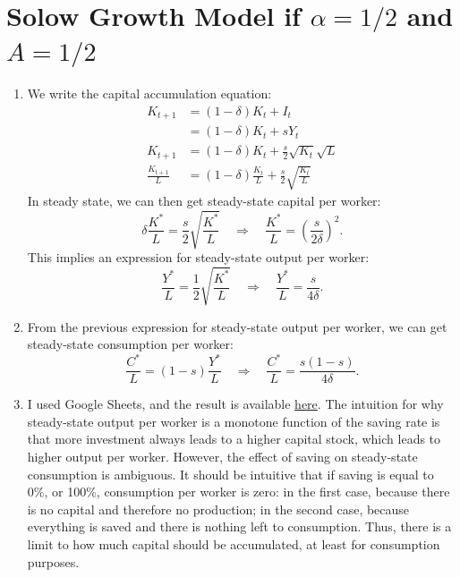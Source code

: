 \documentclass[]{book}
\theoremstyle{definition}
\theoremstyle{definition}
\theoremstyle{definition}
\theoremstyle{remark}
\begin{document}
\section{\texorpdfstring{Solow Growth Model if \(\alpha = 1/2\) and
\(A=1/2\)}{Solow Growth Model if \textbackslash{}alpha = 1/2 and A=1/2}}\label{solow-growth-model-if-alpha-12-and-a12-1}

\begin{enumerate}
\def\labelenumi{\arabic{enumi}.}
\item
  We write the capital accumulation equation: \[\begin{aligned}
  K_{t+1}&=(1-\delta)K_{t}+I_{t}\\
  &=(1-\delta)K_{t}+sY_{t}\\
  K_{t+1} &=(1-\delta)K_{t}+\frac{s}{2}\sqrt{K_{t}}\sqrt{L}\\
  \frac{K_{t+1}}{L}&=(1-\delta)\frac{K_{t}}{L}+\frac{s}{2}\sqrt{\frac{K_{t}}{L}}
  \end{aligned}\] In steady state, we can then get steady-state capital
  per worker:
  \[\delta\frac{K^{*}}{L}=\frac{s}{2}\sqrt{\frac{K^{*}}{L}}\quad\Rightarrow\quad\boxed{\frac{K^{*}}{L}=\left(\frac{s}{2\delta}\right)^{2}}.\]
  This implies an expression for steady-state output per worker:
  \[\frac{Y^{*}}{L}=\frac{1}{2}\sqrt{\frac{K^{*}}{L}} \quad \Rightarrow \quad \boxed{\frac{Y^{*}}{L}=\frac{s}{4\delta}}.\]
\item
  From the previous expression for steady-state output per worker, we
  can get steady-state consumption per worker:
  \[\frac{C^{*}}{L}=(1-s)\frac{Y^{*}}{L}\quad\Rightarrow\quad\boxed{\frac{C^{*}}{L}=\frac{s(1-s)}{4\delta}}.\]
\item
  I used Google Sheets, and the result is available
  \href{https://docs.google.com/spreadsheets/d/1dkygwhDNT79cU_mTVXWal4RyGwX38OTnu5iS5UTz1fc/edit?usp=sharing}{here}.
  The intuition for why steady-state output per worker is a monotone
  function of the saving rate is that more investment always leads to a
  higher capital stock, which leads to higher output per worker.
  However, the effect of saving on steady-state consumption is
  ambiguous. It should be intuitive that if saving is equal to 0\%, or
  100\%, consumption per worker is zero: in the first case, because
  there is no capital and therefore no production; in the second case,
  because everything is saved and there is nothing left to consumption.
  Thus, there is a limit to how much capital should be accumulated, at
  least for consumption purposes.
\end{enumerate}
\end{document}
